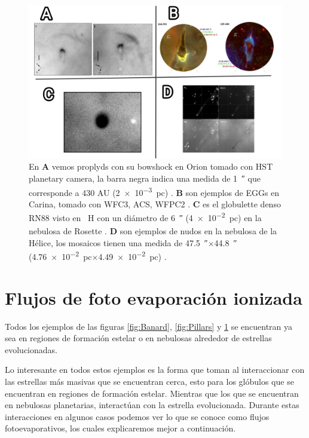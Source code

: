 \documentclass{book}
\begin{document}
\begin{figure}[h]
    \centering
    \includegraphics[width=1 \textwidth]{images Chapter 1/C1_Globulettes.jpg}
    \caption{En \textbf{A} vemos proplyds con su bowshock en Orion tomado con HST planetary camera, la barra negra indica una medida de \SI{1}{\arcsecond} que corresponde a 430 AU (\SI{2e-3}{pc}) \citep{Garcia-Arredondo:2001}. \textbf{B} son ejemplos de EGGs en Carina, tomado con WFC3, ACS, WFPC2 \citep{Mesa-Delgado:2016}. \textbf{C} es el globulette denso RN88 visto en \SI{}{H_\alpha} con un diámetro de \SI{6}{\arcsecond} (\SI{4e-2}{pc}) en la nebulosa de Rosette \citep{GFGahm:2013}. \textbf{D} son ejemplos de nudos en la nebulosa de la Hélice, los mosaicos tienen una medida de \SI{47.5}{\arcsecond}$\times$\SI{44.8}{\arcsecond} (\SI{4.76e-2}{pc}$\times$\SI{4.49e-2}{pc}) \citep{O'Dell:2007}. }
    \label{fig:nudos}
\end{figure}



\section{Flujos de foto evaporación ionizada} \label{Sec:fluijos fotoevaporativos}

Todos los ejemplos de las figuras \ref{fig:Banard}, \ref{fig:Pillars} y \ref{fig:nudos} se encuentran ya sea en regiones de formación estelar o en nebulosas alrededor de estrellas evolucionadas. 

Lo interesante en todos estos ejemplos es la forma que toman al interaccionar con las estrellas más masivas que se encuentran cerca, esto para los glóbulos que se encuentran en regiones de formación estelar.  Mientras que los que se encuentran en nebulosas planetarias, interactúan con la estrella evolucionada. Durante estas interacciones en algunos casos podemos ver lo que se conoce como flujos fotoevaporativos, los cuales explicaremos mejor a continuación.
\end{document}
